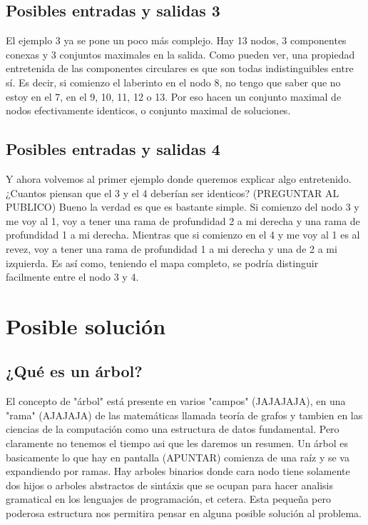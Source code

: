 \documentclass[conference]{IEEEtran}
\begin{document}
\subsection{Posibles entradas y salidas 3}
El ejemplo 3 ya se pone un poco más complejo. Hay 13 nodos, 3 componentes conexas y 3 conjuntos maximales en la salida. Como pueden ver, una propiedad entretenida de las componentes circulares es que son todas indistinguibles entre sí. Es decir, si comienzo el laberinto en el nodo 8, no tengo que saber que no estoy en el 7, en el 9, 10, 11, 12 o 13. Por eso hacen un conjunto maximal de nodos efectivamente identicos, o conjunto maximal de soluciones.

\subsection{Posibles entradas y salidas 4}
Y ahora volvemos al primer ejemplo donde queremos explicar algo entretenido. ¿Cuantos piensan que el 3 y el 4 deberían ser identicos? (PREGUNTAR AL PUBLICO) Bueno la verdad es que es bastante simple. Si comienzo del nodo 3 y me voy al 1, voy a tener una rama de profundidad 2 a mi derecha y una rama de profundidad 1 a mi derecha. Mientras que si comienzo en el 4 y me voy al 1 es al revez, voy a tener una rama de profundidad 1 a mi derecha y una de 2 a mi izquierda. Es así como, teniendo el mapa completo, se podría distinguir facilmente entre el nodo 3 y 4.

\section{Posible solución}

\subsection{¿Qué es un árbol?}
El concepto de "árbol" está presente en varios "campos" (JAJAJAJA), en una "rama" (AJAJAJA) de las matemáticas llamada teoría de grafos y tambien en las ciencias de la computación como una estructura de datos fundamental. Pero claramente no tenemos el tiempo asi que les daremos un resumen. Un árbol es basicamente lo que hay en pantalla (APUNTAR) comienza de una raíz y se va expandiendo por ramas. Hay arboles binarios donde cara nodo tiene solamente dos hijos o arboles abstractos de sintáxis que se ocupan para hacer analisis gramatical en los lenguajes de programación, et cetera. Esta pequeña pero poderosa estructura nos permitira pensar en alguna posible solución al problema.
\end{document}
